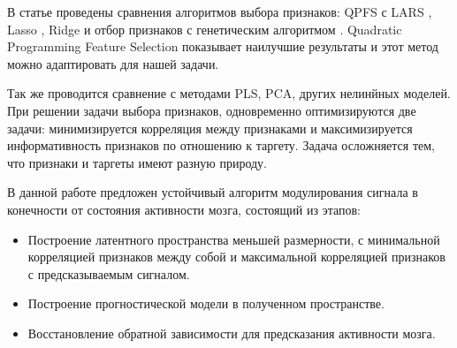 \documentclass{article}
\begin{document}
В статье \cite{qpfs} проведены сравнения алгоритмов выбора признаков: QPFS \cite{qpfs} с LARS \cite{MICHE20112413}, Lasso \cite{zhao2007stagewise}, Ridge \cite{ridge} и отбор признаков с генетическим алгоритмом \cite{tan2008genetic}. Quadratic Programming Feature Selection \cite{qpfs} показывает наилучшие результаты и этот метод можно адаптировать для нашей задачи. \par
Так же проводится сравнение с методами PLS, PCA, других нелинйных моделей.  При решении задачи выбора признаков, одновременно оптимизируются две задачи: минимизируется корреляция между признаками и максимизируется информативность признаков по отношению к таргету. Задача осложняется тем, что признаки и таргеты имеют разную природу. \par
В данной работе предложен устойчивый алгоритм модулирования сигнала в конечности от состояния активности мозга, состоящий из этапов:
\begin{itemize}
    \item Построение латентного пространства меньшей размерности, с минимальной корреляцией признаков между собой и максимальной корреляцией признаков с предсказываемым сигналом.
    \item Построение прогностической модели в полученном пространстве.
     \item Восстановление обратной зависимости для предсказания активности мозга.
\end{itemize}
\end{document}
